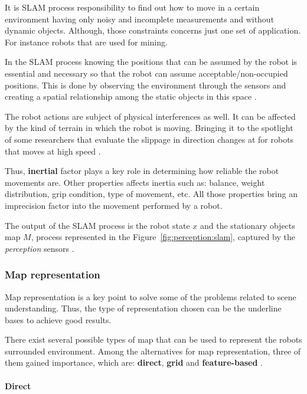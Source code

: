 It is SLAM process responsibility to find out how to move in a certain environment having only noisy and incomplete measurements and without dynamic objects. Although, those constraints concerns just one set of application. For instance robots that are used for mining.

In the SLAM process knowing the positions that can be assumed by the robot is essential and necessary so that the robot can assume acceptable/non-occupied positions. This is done by observing the environment through the sensors and creating a spatial relationship among the static objects in this space \cite{iyengar1991autonomous}.

The robot actions are subject of physical interferences as well. It can be affected by the kind of terrain in which the robot is moving. Bringing it to the spotlight of some researchers that evaluate the slippage in direction changes at for robots that moves at high speed \cite{DBLP:conf/icra/LenainTHM11}. 

Thus, \textbf{inertial} factor plays a key role in determining how reliable the robot movements are. Other properties affects inertia such as: balance, weight distribution, grip condition, type of movement, etc. All those properties bring an imprecision factor into the movement performed by a robot. 

The output of the SLAM process is the robot state $x$ and the stationary objects map $M$, process represented in the Figure~\ref{fig:perception:slam}, captured by the \textit{perception} sensors \cite{iyengar1991autonomous}.

\subsubsection{Map representation}

Map representation is a key point to solve some of the problems related to scene understanding. Thus, the type of representation chosen can be the underline bases to achieve good results.

There exist several possible types of map that can be used to represent the robots surrounded environment. Among the alternatives for map representation, three of them gained importance, which are: \textbf{direct}, \textbf{grid} and \textbf{feature-based} \cite{Wang04a}.

\paragraph{Direct}

